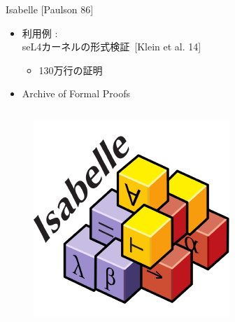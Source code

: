 \documentclass[17pt]{beamer}
\begin{document}
\begin{frame}{Isabelle {\small [Paulson 86]}}
    \vspace{-5pt}
    \begin{itemize}[itemsep=3pt]
        \item 利用例 : \\
            seL4カーネルの形式検証 {\small \,[Klein et al. 14]}
            \vspace{-3pt}
            \begin{itemize}[itemsep=2pt]
                \item 130万行の証明
            \end{itemize}
        \item Archive of Formal Proofs
    \end{itemize}
    
    \begin{columns}
        \begin{column}{0.25\textwidth}
            \begin{figure}
                \includegraphics[width=0.7\linewidth]{./images/isabelle_logo.png}
            \end{figure}
        \end{column}
        \begin{column}{0.25\textwidth}
            \vspace{-7pt}
            \begin{figure}

\end{figure}
\end{column}
\end{columns}
\end{frame}
\end{document}
